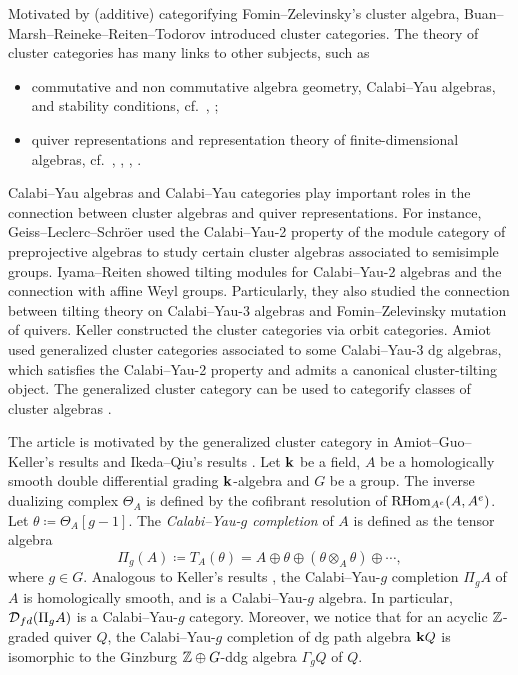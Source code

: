 Motivated by (additive) categorifying Fomin--Zelevinsky's cluster algebra,
Buan--Marsh--Reineke--Reiten--Todorov \cite{BMRRT}
introduced cluster categories.
The theory of cluster categories has many links to other subjects, such as
\begin{itemize}
  \item commutative and non commutative algebra geometry,
    Calabi--Yau algebras, and stability conditions, cf.\ \cite{K5}, \cite{Q12};
  \item quiver representations and representation theory
    of finite-dimensional algebras,
    cf.\ \cite{BM}, \cite{BMRRT}, \cite{GLS}, \cite{IY2}.
\end{itemize}
Calabi--Yau algebras and Calabi--Yau categories play important roles
in the connection between cluster algebras and quiver representations.
For instance, Geiss--Leclerc--Schr\"{o}er \cite{GLS}
used the Calabi--Yau-2 property of the module category of preprojective algebras
to study certain cluster algebras associated to semisimple groups.
Iyama--Reiten \cite{IR} showed tilting modules for Calabi--Yau-2 algebras
and the connection with affine Weyl groups.
Particularly, they also studied the connection
between tilting theory on Calabi--Yau-3 algebras
and Fomin--Zelevinsky mutation of quivers.
Keller \cite{K3} constructed the cluster categories via orbit categories.
Amiot \cite{A} used generalized cluster categories
associated to some Calabi--Yau-3 dg algebras,
which satisfies the Calabi--Yau-2 property
and admits a canonical cluster-tilting object.
The generalized cluster category can be used
to categorify classes of cluster algebras \cite{K5}.

The article is motivated by the generalized cluster category
in Amiot--Guo--Keller's results \cite{A, Guo, K2}
and Ikeda--Qiu's results \cite[Theorem 6.7]{Q12}.
Let $\mathbf{k}$ be a field, $A$ be a homologically smooth
double differential grading $\mathbf{k}$-algebra and $G$ be a group.
The inverse dualizing complex $\Theta_A$
is defined by the cofibrant resolution of $\operatorname{RHom}_{A^e}(A, A^e)$.
Let $\theta \coloneq \Theta_A[g-1]$.
The \textit{Calabi--Yau-$g$ completion} of $A$ is defined as the tensor algebra
\[
  \Pi_g(A) \coloneq T_A(\theta)
  = A \oplus \theta \oplus (\theta \otimes_A \theta)\oplus \cdots,
\]
where $g \in G$.
Analogous to Keller's results \cite{K2},
the Calabi--Yau-$g$ completion $\Pi_gA$ of $A$ is homologically smooth,
and is a Calabi--Yau-$g$ algebra.
In particular, $\operatorname{\mathcal{D}}_{fd}(\Pi_gA)$ is a Calabi--Yau-$g$ category.
Moreover, we notice that for an acyclic $\mathbb{Z}$-graded quiver $Q$,
the Calabi--Yau-$g$ completion of dg path algebra $\mathbf{k} Q$
is isomorphic to the Ginzburg $\mathbb{Z} \oplus G$-ddg algebra $\Gamma_g Q$ of $Q$.

